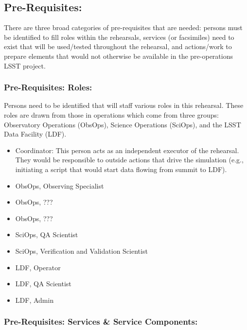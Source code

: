 \clearpage
\subsection{Pre-Requisites:}

There are three broad categories of pre-requisites that are needed: persons 
must be identified to fill roles within the rehearsals, services 
(or facsimiles) need to exist that will be used/tested throughout the 
rehearsal, and actions/work to prepare elements that would not otherwise 
be available in the pre-operations LSST project.

 
\subsubsection{Pre-Requisites: Roles:}

Persons need to be identified that will staff various roles in this 
rehearsal.  These roles are drawn from those in operations which come
from three groups: Observatory Operations (ObsOps), Science Operations 
(SciOps), and the LSST Data Facility (LDF).
\begin{itemize}[topsep=-8pt]
\item Coordinator:  This person acts as an independent executor of the 
rehearsal.  They would be responsible to outside actions that drive the 
simulation (e.g., initiating a script that would start data flowing from 
summit to LDF).
\item ObsOps, Observing Specialist
\item ObsOps, ???
\item ObsOps, ???
\item SciOps, QA Scientist
\item SciOps, Verification and Validation Scientist
\item LDF, Operator
\item LDF, QA Scientist
\item LDF, Admin
\end{itemize}

\subsubsection{Pre-Requisites: Services \& Service Components:}

